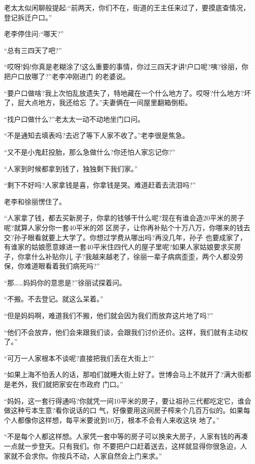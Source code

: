 \documentclass[11pt,a4paper,onecolumn]{article}
\begin{document}
老太太似闲聊般提起:``前两天，你们不在，街道的王主任来过了，要摸底查情况，登记拆迁户口。''

老李停住问:``哪天?''

``总有三四天了吧?''

``哎呀!妈!你真是老糊涂了!这么重要的事情，你过三四天才讲!户口呢?咦?徐丽，你把户口放哪了?''老李冲刚进门
的老婆说。

``要户口做啥?我上次怕乱放遗失了，特地藏在一个什么地方了。哎呀?什么地方?坏了，屁大点地方，我还给忘
了。''夫妻俩在一间屋里翻箱倒柜。

``找户口做什么?''老太太一动不动地坐门口问。

``不是通知去填表吗?去迟了等下人家不收了。''老李很是焦急。

``又不是小鬼赶投胎，那么急做什么?你还怕人家忘记你?''

``人家到时候都拿到钱了，独独剩下我们家。''

``剩下不好吗?人家拿钱是喜，你拿钱是哭。难道赶着去流泪吗?''

老李和徐丽愣住了。

``人家拿了钱，都去买新房子，你拿的钱够干什么呢?现在有谁会造20平米的房子呢?就算人家分你一套40平米的郊
区房子，让你再补贴个十万八万，你哪来的钱去交?孙子眼看就要上大学了。你想过学费从哪出吗?再没几年，孙子
也要成家了，有谁家的姑娘愿意嫁进一套40平米住四代人的屋子里呢?如果人家姑娘要求买房子，你拿什么补贴你儿
子?我越来越老了，徐丽一辈子病病歪歪，两个人都没劳保，你难道眼看着我们病死吗?''

``那……妈妈你的意思是?''徐丽试探着问。

``不搬。不去登记。就这么呆着。''

``但是妈妈啊，难道我们不搬，他们就会因为我们而放弃这片地了吗?''

``他们不会放弃，他们会来跟我们谈，会跟我们讨价还价。这样，我们就有主动权了。''

``可万一人家根本不谈呢?直接把我们丢在大街上?''

``如果上海不怕丢人的话，那咱们就睡大街上好了。世博会马上不就开了?满大街都是老外，我们就把家安在市政府
门口。''

``妈妈，这一套行得通吗?你就凭一间10平米的房子，要让祖孙三代都吃定它，谁会做这种亏本生意?看你说话的口
气，好像要用这间房子榨来个几百万似的。如果每个人都像你这样想，每平米要讹到10万，根本不会有人来收这块
地了。''

``不是每个人都这样想。人家凭一套中等的房子可以换来大房子，人家有钱的再凑一点就一步登天。只有我们。你
不要把户口赶着送去，这样就显得你很急迫，人家就不会求你。你按兵不动，人家自然会上门来求。''
\end{document}
